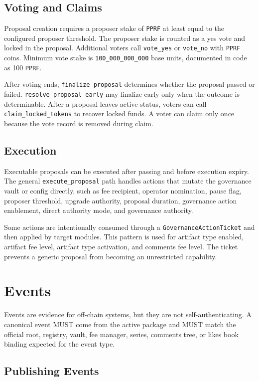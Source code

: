 \documentclass[11pt]{article}
\newcommand{\code}[1]{\texttt{#1}}
\newcommand{\pprf}{\code{PPRF}}
\begin{document}
\subsection{Voting and Claims}

Proposal creation requires a proposer stake of \pprf{} at least equal to the configured proposer threshold. The proposer stake is counted as a yes vote and locked in the proposal. Additional voters call \code{vote\_yes} or \code{vote\_no} with \pprf{} coins. Minimum vote stake is \code{100\_000\_000\_000} base units, documented in code as 100 \pprf{}.

After voting ends, \code{finalize\_proposal} determines whether the proposal passed or failed. \code{resolve\_proposal\_early} may finalize early only when the outcome is determinable. After a proposal leaves active status, voters can call \code{claim\_locked\_tokens} to recover locked funds. A voter can claim only once because the vote record is removed during claim.

\subsection{Execution}

Executable proposals can be executed after passing and before execution expiry. The general \code{execute\_proposal} path handles actions that mutate the governance vault or config directly, such as fee recipient, operator nomination, pause flag, proposer threshold, upgrade authority, proposal duration, governance action enablement, direct authority mode, and governance authority.

Some actions are intentionally consumed through a \code{GovernanceActionTicket} and then applied by target modules. This pattern is used for artifact type enabled, artifact fee level, artifact type activation, and comments fee level. The ticket prevents a generic proposal from becoming an unrestricted capability.

\section{Events}

Events are evidence for off-chain systems, but they are not self-authenticating. A canonical event MUST come from the active package and MUST match the official root, registry, vault, fee manager, series, comments tree, or likes book binding expected for the event type.

\subsection{Publishing Events}
\end{document}
